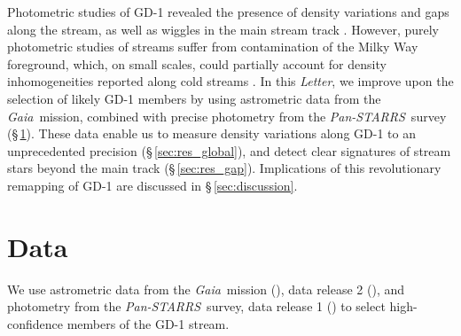 \documentclass[modern]{aastex62}
\newcommand{\acronym}[1]{{\small{#1}}}
\newcommand{\gaia}{\textsl{Gaia}}
\newcommand{\pans}{\textsl{Pan-STARRS}}
\newcommand{\DR}{\acronym{DR2}}
\newcommand{\article}{\textsl{Letter}}
\newcommand{\todo}[1]{{\color{red} TODO: #1}}
\begin{document}
Photometric studies of GD-1 revealed the presence of density variations and gaps
along the stream, as well as wiggles in the main stream track
\citep[][]{Carlberg:2013, DeBoer:2018}.
However, purely photometric studies of streams suffer from contamination of the
Milky Way foreground, which, on small scales, could partially account for
density inhomogeneities reported along cold streams \citep[e.g.,][]{Ibata:2016}.
In this \article, we improve upon the selection of likely GD-1 members by using
astrometric data from the \gaia\ mission, combined with precise photometry from
the \pans\ survey (\S\,\ref{sec:data}).
These data enable us to measure density variations along GD-1 to an
unprecedented precision (\S\,\ref{sec:res_global}), and detect clear signatures
of stream stars beyond the main track (\S\,\ref{sec:res_gap}).
Implications of this revolutionary remapping of GD-1 are discussed in
\S\,\ref{sec:discussion}.
%


\section{Data}
\label{sec:data}

We use astrometric data from the \gaia\ mission (\citealt{Prusti:2016}), data
release 2 (\citealt{Gaia-Collaboration:2018, Lindegren:2018}), and photometry
from the \pans\ survey, data release 1 (\citealt{Chambers:2016}) to select
high-confidence members of the GD-1 stream.
\end{document}
